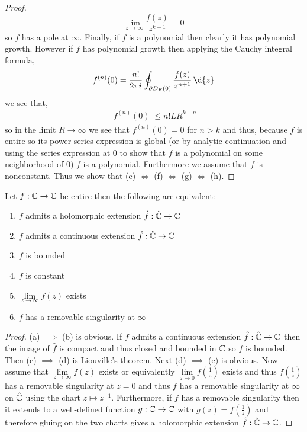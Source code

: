 \documentclass[12pt]{article}
\begin{document}
\begin{proof}
\[ \lim_{z \to \infty} \frac{f(z)}{z^{k+1}} = 0 \]
so $f$ has a pole at $\infty$. Finally, if $f$ is a polynomial then clearly it has polynomial growth. However if $f$ has polynomial growth then applying the Cauchy integral formula,
\[ f^{(n)}(0) = \frac{n!}{2 \pi i} \oint_{\partial D_R(0)} \frac{f(z)}{z^{n+1}} \, \d{z} \]
we see that,
\[ |f^{(n)}(0)| \le n! L R^{k - n} \]
so in the limit $R \to \infty$ we see that $f^{(n)}(0) = 0$ for $n > k$ and thus, because $f$ is entire so its power series expression is global (or by analytic continuation and using the series expression at $0$ to show that $f$ is a polynomial on some neighborhood of $0$) $f$ is a polynomial. Furthermore we assume that $f$ is nonconstant. Thus we show that (e) $\iff$ (f) $\iff$ (g) $\iff$ (h).
\end{proof}

\begin{prop}
Let $f : \mathbb{C} \to \mathbb{C}$ be entire then the following are equivalent:
\begin{enumerate}
\item $f$ admits a holomorphic extension $\hat{f} : \hat{\mathbb{C}} \to \mathbb{C}$
\item $f$ admits a continuous extension $\hat{f} : \hat{\mathbb{C}} \to \mathbb{C}$
\item $f$ is bounded
\item $f$ is constant
\item $\lim\limits_{z \to \infty} f(z)$ exists
\item $f$ has a removable singularity at $\infty$
\end{enumerate}
\end{prop}

\begin{proof}
(a) $\implies$ (b) is obvious. If $f$ admits a continuous extension $\hat{f} : \hat{\mathbb{C}} \to \mathbb{C}$ then the image of $\hat{f}$ is compact and thus closed and bounded in $\mathbb{C}$ so $f$ is bounded. Then (c) $\implies$ (d) is Liouville's theorem. Next (d) $\implies$ (e) is obvious. Now assume that $\lim\limits_{z \to \infty} f(z)$ exists or equivalently $\lim\limits_{z \to 0} f(\frac{1}{z})$ exists and thus $f(\frac{1}{z})$ has a removable singularity at $z = 0$ and thus $f$ has a removable singularity at $\infty$ on $\hat{\mathbb{C}}$ using the chart $z \mapsto z^{-1}$. Furthermore, if $f$ has a removable singularity then it extends to a well-defined function $g : \mathbb{C} \to \mathbb{C}$ with $g(z) = f(\frac{1}{z})$ and therefore gluing on the two charts gives a holomorphic extension $\hat{f} : \hat{\mathbb{C}} \to \mathbb{C}$.
\end{proof}
\end{document}
